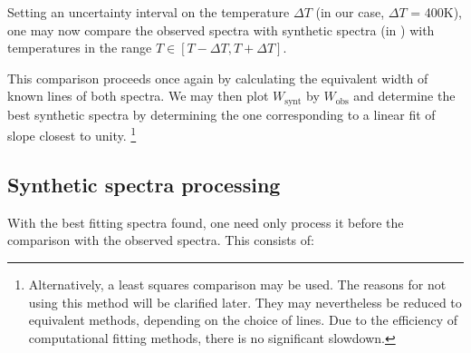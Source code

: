 \documentclass{aa}
\begin{document}
Setting an uncertainty interval on the temperature $\Delta T$  (in our case,
$\Delta T$ = 400K), one may now compare the observed spectra with synthetic
spectra (in \cite{laverny_ambre_2012}) with temperatures in the range $T\in [T - \Delta T, T + \Delta T]$.

This comparison proceeds once again by calculating the equivalent width of known
lines of both spectra. We may then plot $W_\text{synt}$ by $W_\text{obs}$ and
determine the best synthetic spectra by determining the one
corresponding to a linear fit of slope closest to unity. \footnote{Alternatively, a least squares
  comparison may be used. The reasons for not using this method will be
  clarified later. They may nevertheless be reduced to equivalent methods,
  depending on the choice of lines. Due to the efficiency of computational
  fitting methods, there is no significant slowdown.}


\subsection{Synthetic spectra processing}

With the best fitting spectra found, one need only process it before the comparison
with the observed spectra. This consists of:
\end{document}
